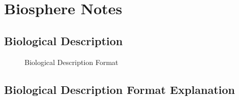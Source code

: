 \chapter{Biosphere Notes}
\section{Biological Description}

\begin{figure}[htb]
\caption{Biological Description Format}
\vspace{2 in}
\end{figure}

\section{Biological Description Format Explanation}

